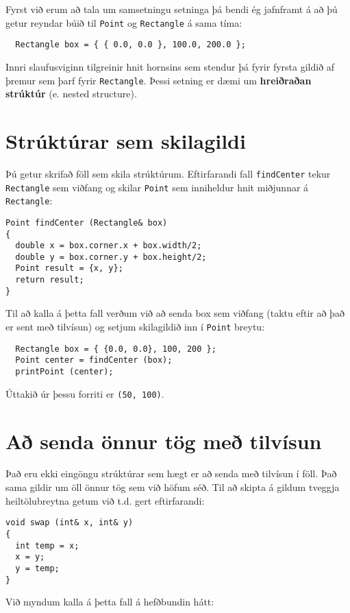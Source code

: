 Fyrst við erum að tala um samsetningu setninga þá bendi ég jafnframt á að þú getur reyndar búið til {\tt Point} og {\tt Rectangle} á sama tíma:

\begin{verbatim}
  Rectangle box = { { 0.0, 0.0 }, 100.0, 200.0 };
\end{verbatim}
%
Innri slaufusviginn tilgreinir hnit hornsins sem stendur þá fyrir fyrsta gildið af þremur sem þarf fyrir {\tt Rectangle}.
Þessi setning er dæmi um {\bf hreiðraðan strúktúr} (e. nested structure).


\section{Strúktúrar sem skilagildi}

Þú getur skrifað föll sem skila strúktúrum.
Eftirfarandi fall {\tt findCenter} tekur {\tt Rectangle} sem viðfang og skilar {\tt Point} sem inniheldur hnit miðjunnar á {\tt Rectangle}:

\begin{verbatim}
Point findCenter (Rectangle& box)
{
  double x = box.corner.x + box.width/2;
  double y = box.corner.y + box.height/2;
  Point result = {x, y};
  return result;
}
\end{verbatim}
%
Til að kalla á þetta fall verðum við að senda box sem viðfang (taktu eftir að það er sent með tilvísun) og setjum skilagildið inn í {\tt Point} breytu:

\begin{verbatim}
  Rectangle box = { {0.0, 0.0}, 100, 200 };
  Point center = findCenter (box);
  printPoint (center);
\end{verbatim}
%
Úttakið úr þessu forriti er {\tt (50, 100)}.

\section {Að senda önnur tög með tilvísun}

Það eru ekki eingöngu strúktúrar sem hægt er að senda með tilvísun í föll.
Það sama gildir um öll önnur tög sem við höfum séð.
Til að skipta á gildum tveggja heiltölubreytna getum við t.d. gert eftirfarandi: 

\begin{verbatim}
void swap (int& x, int& y)
{
  int temp = x;
  x = y;
  y = temp;
}
\end{verbatim}
%
Við myndum kalla á þetta fall á hefðbundin hátt:


